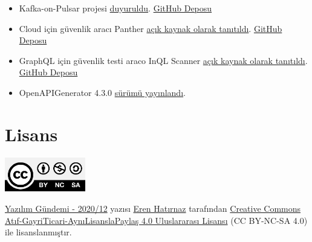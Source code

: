 \documentclass[11pt]{article}
\begin{document}
\begin{itemize}
\item Kafka-on-Pulsar projesi \href{https://streamnative.io/blog/tech/2020-03-24-bring-native-kafka-protocol-support-to-apache-pulsar/}{duyuruldu}. \href{https://github.com/streamnative/kop}{GitHub Deposu}
\item Cloud için güvenlik aracı Panther \href{https://blog.runpanther.io/panther-v1-open-source-siem/}{açık kaynak olarak tanıtıldı}. \href{https://github.com/panther-labs/panther}{GitHub
Deposu}
\item GraphQL için güvenlik testi araco InQL Scanner \href{https://blog.doyensec.com/2020/03/26/graphql-scanner.html}{açık kaynak olarak tanıtıldı}.
\href{https://github.com/doyensec/inql}{GitHub Deposu}
\item OpenAPIGenerator 4.3.0 \href{https://github.com/OpenAPITools/openapi-generator/releases/tag/v4.3.0}{sürümü yayınlandı}.
\end{itemize}
\section{Lisans}
\label{sec:orga6e56b0}
\begin{center}
\begin{center}
\includegraphics[height=1.5cm]{../../../img/CC_BY-NC-SA_4.0.png}
\end{center}

\href{yazilim-gundemi-2020-12.pdf}{Yazılım Gündemi - 2020/12} yazısı \href{https://erenhatirnaz.github.io}{Eren Hatırnaz} tarafından \href{http://creativecommons.org/licenses/by-nc-sa/4.0/}{Creative Commons
Atıf-GayriTicari-AynıLisanslaPaylaş 4.0 Uluslararası Lisansı} (CC BY-NC-SA 4.0)
ile lisanslanmıştır.
\end{center}
\end{document}
